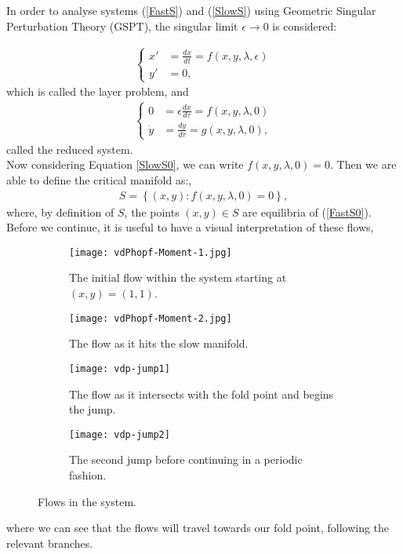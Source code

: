 In order to analyse systems (\ref{FastS}) and (\ref{SlowS}) using Geometric Singular Perturbation Theory (GSPT), the singular limit $\epsilon \to 0$ is considered:

\begin{align} \label{FastS0}
\begin{cases}
x' &=\frac{dx}{dt}= f(x,y,\lambda, \epsilon)\\
y' &= 0,
\end{cases}
\end{align}
which is called the layer problem, and
\begin{align}\label{SlowS0}
\begin{cases}
0 &= \epsilon \frac{dx}{d \tau} = f(x,y,\lambda, 0)\\
\dot{y} & = \frac{dy}{d \tau} =  g( x,y, \lambda,0),
\end{cases}
\end{align}
called the reduced system.\\

Now considering Equation \ref{SlowS0}, we can write $f(x,y,\lambda, 0)=0$. Then we are able to define the critical manifold as:,
\begin{align} \label{CriticalS}
S= \left\{ (x,y) : f(x,y,\lambda, 0)=0 \right \},
\end{align}
where, by definition of $S$, the points $(x,y) \in S$ are equilibria of (\ref{FastS0}). Before we continue, it is useful to have a visual interpretation of these flows,
\begin{figure}[h!]\centering

	\begin{subfigure}[t]{0.45\textwidth}
		\centering
		\texttt{[image: vdPhopf-Moment-1.jpg]}
		\caption{The initial flow within the system starting at $ (x,y)=(1,1) $.}
	\end{subfigure}
	\hfill
	\begin{subfigure}[t]{0.45\textwidth}
		\centering
		\texttt{[image: vdPhopf-Moment-2.jpg]}
		\caption{The flow as it hits the slow manifold.}
	\end{subfigure}

	\vspace{1cm}
	\begin{subfigure}[t]{0.45\textwidth}
		\centering
		\texttt{[image: vdp-jump1]}
		\caption{The flow as it intersects with the fold point and begins the jump.}
	\end{subfigure}
	\hfill
	\begin{subfigure}[t]{0.45\textwidth}\centering
		\texttt{[image: vdp-jump2]}
		\caption{The second jump before continuing in a periodic fashion.}
	\end{subfigure}
	\caption{Flows in the \vdp system.}
	\label{fig: vdp flow diagram}
\end{figure}\newline
where we can see that the flows will travel towards our fold point, following the relevant branches.
